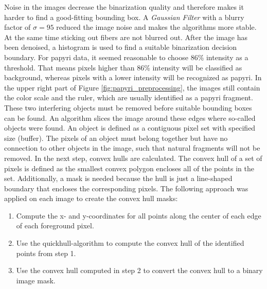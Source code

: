 \noindent Noise in the images decrease the binarization quality and therefore makes it harder to find a good-fitting bounding box. A \textit{Gaussian Filter} with a blurry factor of $\sigma=95$ reduced the image noise and makes the algorithms more stable. At the same time sticking out fibers are not blurred out. After the image has been denoised, a histogram is used to find a suitable binarization decision boundary. For papyri data, it seemed reasonable to choose 86\% intensity as a threshold. That means pixels higher than 86\% intensity will be classified as background, whereas pixels with a lower intensity will be recognized as papyri. In the upper right part of Figure \ref{fig:papyri_preprocessing}, the images still contain the color scale and the ruler, which are usually identified as a papyri fragment. These two interfering objects must be removed before suitable bounding boxes can be found. An algorithm slices the image around these edges where so-called objects were found. An object is defined as a contiguous pixel set with specified size (buffer). The pixels of an object must belong together but have no connection to other objects in the image, such that natural fragments will not be removed. In the next step, convex hulls are calculated. The convex hull of a set of pixels is defined as the smallest convex polygon encloses all of the points in the set. Additionally, a mask is needed because the hull is just a line-shaped boundary that encloses the corresponding pixels. The following approach was applied on each image to create the convex hull masks: 

\begin{enumerate}
	\item Compute the x- and y-coordinates for all points along the center of each edge of each foreground pixel.
	\item Use the quickhull-algorithm to compute the convex hull of the identified points from step 1. 
	\item Use the convex hull computed in step 2 to convert the convex hull to a binary image mask.
\end{enumerate}

